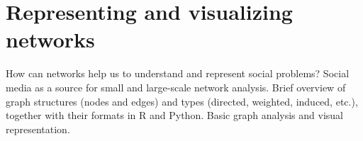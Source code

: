 \section{Representing and visualizing networks}
\label{sec:graph}

How can networks help us to understand and represent social problems? Social media as a source for small and large-scale network analysis. Brief overview of graph structures (nodes and edges) and types (directed, weighted, induced, etc.), together with their formats in R and Python. Basic graph analysis and visual representation.  
